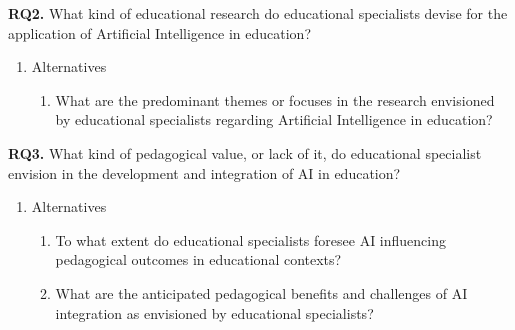 \item[] \textbf{RQ2.} What kind of educational research do educational specialists devise for the application of Artificial Intelligence in education?
    \begin{enumerate}
        \item[] Alternatives
        \begin{enumerate}
            \item What are the predominant themes or focuses in the research envisioned by educational specialists regarding Artificial Intelligence in education? 
        \end{enumerate}
    \end{enumerate}
    \item [] \textbf{RQ3.} What kind of pedagogical value, or lack of it, do educational specialist envision in the development and integration of AI in education?
    \begin{enumerate}
        \item [] Alternatives
        \begin{enumerate}
            \item To what extent do educational specialists foresee AI influencing pedagogical outcomes in educational contexts?
            \item What are the anticipated pedagogical benefits and challenges of AI integration as envisioned by educational specialists? 
        \end{enumerate}
    \end{enumerate}
